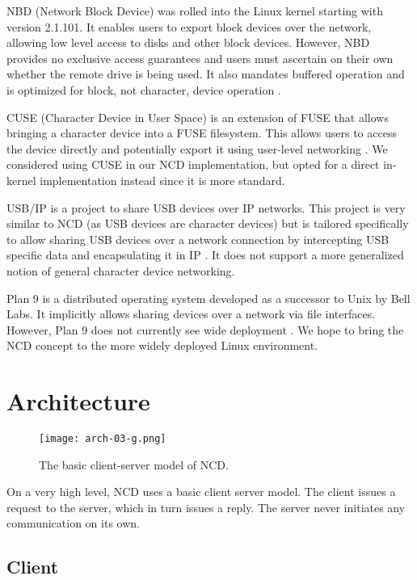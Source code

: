 \documentclass[11pt,twocolumn]{article}
\begin{document}
NBD (Network Block Device) was rolled into the Linux kernel starting
with version 2.1.101. It enables users to export block devices over the
network, allowing low level access to disks and other block devices.
However, NBD provides no
exclusive access guarantees and users must ascertain on their own
whether the remote drive is being used. It also mandates buffered
operation and is optimized for block, not character, device operation
\cite{nbd-source}.

CUSE (Character Device in User Space) is an extension of FUSE that
allows bringing a character device into a FUSE filesystem.  This allows
users to access the device directly and potentially export it using
user-level networking \cite{cuse-article}. We considered using CUSE in
our NCD implementation, but opted for a direct in-kernel implementation
instead since it is more standard.

USB/IP is a project to share USB devices over IP networks. This project is
very similar to NCD (as USB devices are character devices) but is
tailored specifically to allow sharing USB devices over a
network connection by intercepting USB specific data and encapsulating
it in IP \cite{usbip-source}. It does not support a more generalized
notion of general character device networking.

Plan 9 is a distributed operating system developed as a successor to
Unix by Bell Labs.  It implicitly allows sharing devices over a
network via file interfaces. However, Plan 9 does not currently see
wide deployment \cite{plan9-pike}. We hope to bring the NCD concept to
the more widely deployed Linux environment.


\section{Architecture}
\label{sec:architecture}

\begin{figure}[h]
  \centering
  \texttt{[image: arch-03-g.png]}
  \caption{The basic client-server model of NCD.}
  \label{fig:architecture}
\end{figure}

On a very high level, NCD uses a basic client server model. The client
issues a request to the server, which in turn issues a reply. The
server never initiates any communication on its own.

\subsection{Client}
\end{document}
